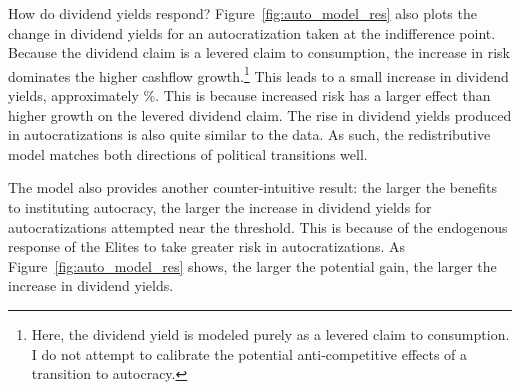 

How do dividend yields respond? Figure~\ref{fig:auto_model_res} also plots the change in dividend yields for an autocratization taken at the indifference point. Because the dividend claim is a levered claim to consumption, the increase in risk dominates the higher cashflow growth.\footnote{Here, the dividend yield is modeled purely as a levered claim to consumption. I do not attempt to calibrate the potential anti-competitive effects of a transition to autocracy.} This leads to a small increase in dividend yields, approximately \autoDivYldChange\%. This is because increased risk has a larger effect than higher growth on the levered dividend claim. The rise in dividend yields produced in autocratizations is also quite similar to the data. As such, the redistributive model matches both directions of political transitions well.

The model also provides another counter-intuitive result: the larger the benefits to instituting autocracy, the larger the increase in dividend yields for autocratizations attempted near the threshold. This is because of the endogenous response of the Elites to take greater risk in autocratizations. As Figure~\ref{fig:auto_model_res} shows, the larger the potential gain, the larger the increase in dividend yields.
